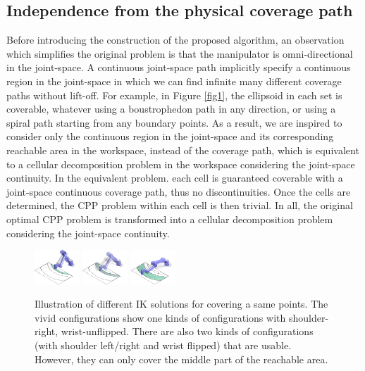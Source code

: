 \documentclass[journal]{IEEEtran}
\begin{document}
\subsection{Independence from the physical coverage path}
Before introducing the construction of the proposed algorithm, an observation which simplifies the original problem is that the manipulator is omni-directional in the joint-space. A continuous joint-space path implicitly specify a continuous region in the joint-space in which we can find infinite many different coverage paths without lift-off. For example, in Figure \ref{fig1}, the ellipsoid in each set is coverable, whatever using a boustrophedon path in any direction, or using a spiral path starting from any boundary points. As a result, we are inspired to consider only the continuous region in the joint-space and its corresponding reachable area in the workspace, instead of the coverage path, which is equivalent to a cellular decomposition problem in the workspace considering the joint-space continuity. In the equivalent problem. each cell is guaranteed coverable with a joint-space continuous coverage path, thus no discontinuities. Once the cells are determined, the CPP problem within each cell is then trivial. 
In all, the original optimal CPP problem is transformed into a cellular decomposition problem considering the joint-space continuity. 


\begin{figure}[t]
\centering
\includegraphics[width = 0.15\textwidth]{square_example/simple_example_merged_545}
\includegraphics[width = 0.15\textwidth]{square_example/simple_example_merged_551}
\includegraphics[width = 0.15\textwidth]{square_example/simple_example_merged_565}
\caption{Illustration of different IK solutions for covering a same points. The vivid configurations show one kinds of configurations with shoulder-right, wrist-unflipped. There are also two kinds of configurations (with shoulder left/right and wrist flipped) that are usable. However, they can only cover the middle part of the reachable area. }\label{figsquare}
\end{figure}
\end{document}
